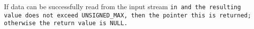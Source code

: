If data can be successfully read from the input stream \tt{in}
and the resulting value does not exceed \tt{UNSIGNED_MAX}, then the
pointer \tt{this} is returned; otherwise the return value is \tt{NULL}.
